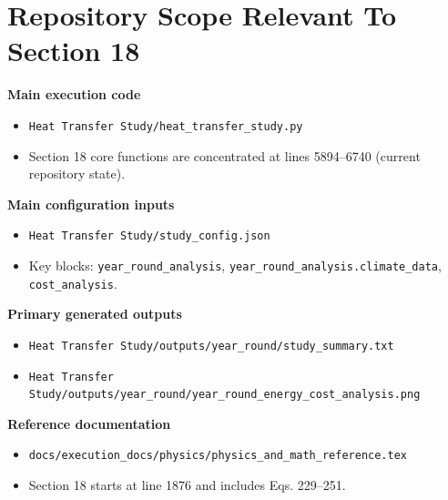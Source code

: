 \documentclass[11pt]{article}
\begin{document}
\section{Repository Scope Relevant To Section 18}
\textbf{Main execution code}
\begin{itemize}[leftmargin=*]
\item \texttt{Heat Transfer Study/heat\_transfer\_study.py}
\item Section 18 core functions are concentrated at lines 5894--6740 (current repository state).
\end{itemize}

\textbf{Main configuration inputs}
\begin{itemize}[leftmargin=*]
\item \texttt{Heat Transfer Study/study\_config.json}
\item Key blocks: \texttt{year\_round\_analysis}, \texttt{year\_round\_analysis.climate\_data}, \texttt{cost\_analysis}.
\end{itemize}

\textbf{Primary generated outputs}
\begin{itemize}[leftmargin=*]
\item \texttt{Heat Transfer Study/outputs/year\_round/study\_summary.txt}
\item \texttt{Heat Transfer Study/outputs/year\_round/year\_round\_energy\_cost\_analysis.png}
\end{itemize}

\textbf{Reference documentation}
\begin{itemize}[leftmargin=*]
\item \texttt{docs/execution\_docs/physics/physics\_and\_math\_reference.tex}
\item Section 18 starts at line 1876 and includes Eqs. 229--251.
\end{itemize}
\end{document}
